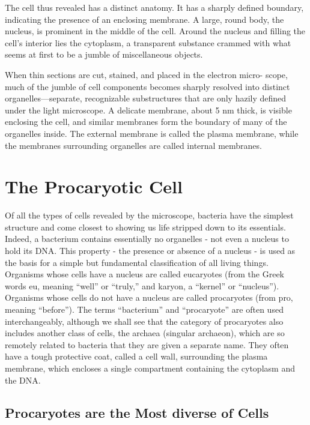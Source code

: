 The cell thus revealed has a distinct anatomy. It has a sharply
defined boundary, indicating the presence of an enclosing membrane.
A large, round body, the nucleus, is prominent in the middle of the cell.
Around the nucleus and filling the cell’s interior lies the cytoplasm, a
transparent substance crammed with what seems at first to be a jumble
of miscellaneous objects.

When thin sections are cut, stained, and placed in the electron micro-
scope, much of the jumble of cell components becomes sharply resolved
into distinct organelles—separate, recognizable substructures that are
only hazily defined under the light microscope. A delicate membrane,
about 5 nm thick, is visible enclosing the cell, and similar membranes
form the boundary of many of the organelles inside. The
external membrane is called the plasma membrane, while the membranes
surrounding organelles are called internal membranes.

\section{The Procaryotic Cell}

Of all the types of cells revealed by the microscope, bacteria have the
simplest structure and come closest to showing us life stripped down to
its essentials. Indeed, a bacterium contains essentially no organelles - not
even a nucleus to hold its DNA. This property - the presence or absence of
a nucleus - is used as the basis for a simple but fundamental classification
of all living things. Organisms whose cells have a nucleus are called
eucaryotes (from the Greek words eu, meaning “well” or “truly,” and
karyon, a “kernel” or “nucleus”). Organisms whose cells do not have a
nucleus are called procaryotes (from pro, meaning “before”). The terms
“bacterium” and “procaryote” are often used interchangeably, although
we shall see that the category of procaryotes also includes another class
of cells, the archaea (singular archaeon), which are so remotely related to
bacteria that they are given a separate name.
They often have a tough protective coat, called a cell wall, surrounding the plasma
membrane, which encloses a single compartment containing the cytoplasm and the DNA.

\subsection{Procaryotes are the Most diverse of Cells}

